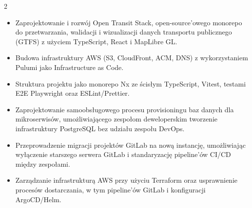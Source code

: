 \documentclass[10pt,a4paper,ragged2e,withhyper]{altacv}
\begin{document}

\makecvheader

\begin{paracol}{2}



\begin{itemize}
\item Zaprojektowanie i rozwój Open Transit Stack, open-source'owego monorepo do przetwarzania, walidacji i wizualizacji danych transportu publicznego (GTFS) z użyciem TypeScript, React i MapLibre GL.
\item Budowa infrastruktury AWS (S3, CloudFront, ACM, DNS) z wykorzystaniem Pulumi jako Infrastructure as Code.
\item Struktura projektu jako monorepo Nx ze ścisłym TypeScript, Vitest, testami E2E Playwright oraz ESLint/Prettier.
\end{itemize}

\divider

\begin{itemize}
\item Zaprojektowanie samoobsługowego procesu provisioningu baz danych dla mikroserwisów, umożliwiającego zespołom deweloperskim tworzenie infrastruktury PostgreSQL bez udziału zespołu DevOps.
\item Przeprowadzenie migracji projektów GitLab na nową instancję, umożliwiając wyłączenie starszego serwera GitLab i standaryzację pipeline'ów CI/CD między zespołami.
\item Zarządzanie infrastrukturą AWS przy użyciu Terraform oraz usprawnienie procesów dostarczania, w tym pipeline'ów GitLab i konfiguracji ArgoCD/Helm.
\end{itemize}

\divider


\end{paracol}
\end{document}
